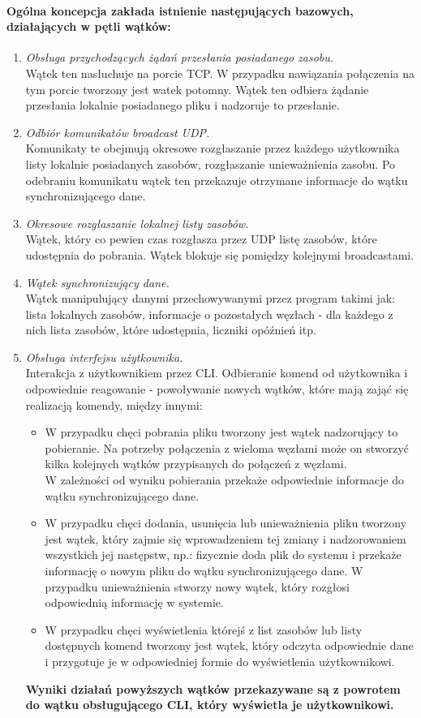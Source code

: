 \documentclass[11pt,oneside]{book}
\newcommand{\+}{\discretionary{\mbox{\scriptsize$\hookleftarrow$}}{}{}}
\begin{document}
\paragraph{Ogólna koncepcja zakłada istnienie następujących bazowych, działających w pętli wątków:}
\begin{enumerate}
\item 
\textsl{Obsługa przychodzących żądań przesłania posiadanego zasobu.}\\
Wątek ten nasłuchuje na porcie TCP. W przypadku nawiązania połączenia na tym porcie tworzony jest watek potomny. Wątek ten odbiera żądanie przesłania lokalnie posiadanego pliku i nadzoruje to przesłanie. 
\item
\textsl{Odbiór komunikatów broadcast UDP.}\\
Komunikaty te obejmują okresowe rozgłaszanie przez każdego użytkownika listy lokalnie posiadanych zasobów, rozgłaszanie unieważnienia zasobu. Po odebraniu komunikatu wątek ten przekazuje otrzymane informacje do wątku synchronizującego dane.
\item
\textsl{Okresowe rozgłaszanie lokalnej listy zasobów.}\\
Wątek, który co pewien czas rozgłasza przez UDP listę zasobów, które udostępnia do pobrania. Wątek blokuje się pomiędzy kolejnymi broadcastami.  
\item
\textsl{Wątek synchronizujący dane.}\\
Wątek manipulujący danymi przechowywanymi przez program takimi jak: lista  lokalnych zasobów, informacje o pozostałych węzłach - dla każdego z nich lista zasobów, które udostępnia, liczniki opóźnień itp.
\item
\textsl{Obsługa interfejsu użytkownika.}\\
Interakcja z użytkownikiem przez CLI. Odbieranie komend od użytkownika i odpowiednie reagowanie - powoływanie nowych wątków, które mają zająć się realizacją komendy, między innymi: 
\begin{itemize}
\item
W przypadku chęci pobrania pliku tworzony jest wątek nadzorujący to pobieranie. Na potrzeby połączenia z wieloma węzłami może on stworzyć kilka kolejnych wątków przypisanych do połączeń z węzłami.\\
W zależności od wyniku pobierania przekaże odpowiednie informacje do wątku synchronizującego dane.
\item
W przypadku chęci dodania, usunięcia lub unieważnienia pliku tworzony jest wątek, który zajmie się wprowadzeniem tej zmiany i nadzorowaniem wszystkich jej następstw, np.: fizycznie doda plik do systemu i przekaże informację o nowym pliku do wątku synchronizującego dane. W przypadku unieważnienia stworzy nowy wątek, który rozgłosi odpowiednią informację w systemie.
\item
W przypadku chęci wyświetlenia którejś z list zasobów lub listy dostępnych komend tworzony jest wątek, który odczyta odpowiednie dane i przygotuje je w odpowiedniej formie do wyświetlenia użytkownikowi.
\end{itemize}
\textbf{Wyniki działań powyższych wątków przekazywane są z powrotem do wątku obsługującego CLI, który wyświetla je użytkownikowi.}
\end{enumerate}
\end{document}
